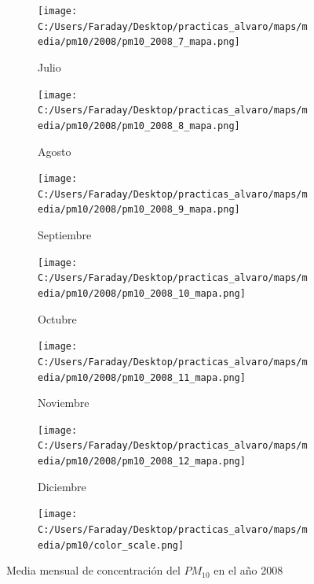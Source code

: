 \documentclass[12pt]{article}
\begin{document}
\begin{figure}[H]
\begin{subfigure}[H]{0.15\textwidth}
\texttt{[image: C:/Users/Faraday/Desktop/practicas\_alvaro/maps/media/pm10/2008/pm10\_2008\_7\_mapa.png]}
\captionsetup{labelformat=empty}
\caption{Julio}
\label{fig:map-pm10-2008-7}
\end{subfigure}
%
\begin{subfigure}[H]{0.15\textwidth}
\texttt{[image: C:/Users/Faraday/Desktop/practicas\_alvaro/maps/media/pm10/2008/pm10\_2008\_8\_mapa.png]}
\captionsetup{labelformat=empty}
\caption{Agosto}
\label{fig:map-pm10-2008-8}
\end{subfigure}
%
\begin{subfigure}[H]{0.15\textwidth}
\texttt{[image: C:/Users/Faraday/Desktop/practicas\_alvaro/maps/media/pm10/2008/pm10\_2008\_9\_mapa.png]}
\captionsetup{labelformat=empty}
\caption{Septiembre}
\label{fig:map-pm10-2008-9}
\end{subfigure}
%
\begin{subfigure}[H]{0.15\textwidth}
\texttt{[image: C:/Users/Faraday/Desktop/practicas\_alvaro/maps/media/pm10/2008/pm10\_2008\_10\_mapa.png]}
\captionsetup{labelformat=empty}
\caption{Octubre}
\label{fig:map-pm10-2008-10}
\end{subfigure}
%
\begin{subfigure}[H]{0.15\textwidth}
\texttt{[image: C:/Users/Faraday/Desktop/practicas\_alvaro/maps/media/pm10/2008/pm10\_2008\_11\_mapa.png]}
\captionsetup{labelformat=empty}
\caption{Noviembre}
\label{fig:map-pm10-2008-11}
\end{subfigure}
%
\begin{subfigure}[H]{0.15\textwidth}
\texttt{[image: C:/Users/Faraday/Desktop/practicas\_alvaro/maps/media/pm10/2008/pm10\_2008\_12\_mapa.png]}
\captionsetup{labelformat=empty}
\caption{Diciembre}
\label{fig:map-pm10-2008-12}
\end{subfigure}

\begin{subfigure}[H]{0.45\textwidth}
\texttt{[image: C:/Users/Faraday/Desktop/practicas\_alvaro/maps/media/pm10/color\_scale.png]}
\captionsetup{labelformat=empty}
\caption{}
\end{subfigure}

\vspace*{-7mm}
\caption{Media mensual de concentración del $PM_{10}$ en el año 2008}
\label{fig:map-pm10-2008}
\end{figure}
\end{document}

